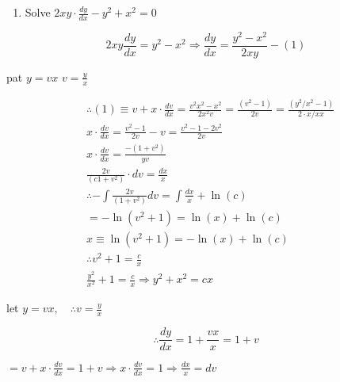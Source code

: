 \documentclass[12pt, a4paper]{article}
\begin{document}
\begin{enumerate}
	\item Solve $2 x y \cdot \frac{dy}{dx}-y^2+x^2 =0$
\end{enumerate}

$$
	2 x y \frac{d y}{d x}=y^2-x^2 \Rightarrow \frac{d y}{d x}=\frac{y^2-x^2 }{2 x y}-(1)
$$

pat $y=v x$ $v=\frac{y}{x}$

$$
	\begin{aligned}
		 & \therefore(1) \equiv v+x \cdot \frac{d v}{d x}=\frac{v^{2} x^2 -x^2 }{2 x^2 v}=\frac{\left(v^{2}-1\right)}{2 v}=\frac{\left(y^2 / x^2 -1\right)}{2 \cdot x / x x} \\
		 & x \cdot \frac{d v}{d x}=\frac{v^{2}-1}{2 v}-v=\frac{v^{2}-1-2 v^{2}}{2 v}                                                                                         \\
		 & x \cdot \frac{d v}{d x}=\frac{-\left(1+v^{2}\right)}{y v}                                                                                                         \\
		 & \frac{2 v}{\left(c 1+v^{2}\right)} \cdot d v=\frac{d x}{x}                                                                                                        \\
		 & \therefore-\int \frac{2 v}{\left(1+v^{2}\right)} d v=\int \frac{d x}{x}+\ln (c)                                                                                   \\
		 & =-\ln \left(v^{2}+1\right)=\ln (x)+\ln (c)                                                                                                                        \\
		 & x \equiv \ln \left(v^{2}+1\right)=-\ln (x)+\ln (c)                                                                                                                \\
		 & \therefore v^{2}+1=\frac{c}{x}                                                                                                                                    \\
		 & \frac{y^2}{x^2 }+1=\frac{c}{x} \Rightarrow y^2+x^2 =c x
	\end{aligned}
$$

let $y=v x, \quad \therefore v=\frac{y}{x}$

$$
	\therefore \frac{d y}{d x}=1+\frac{v x}{x}=1+v
$$

$=v+x \cdot \frac{d v}{d x}=1+v \Rightarrow x \cdot \frac{d v}{d x}=1 \Rightarrow \frac{d x}{x}=d v$
\end{document}
